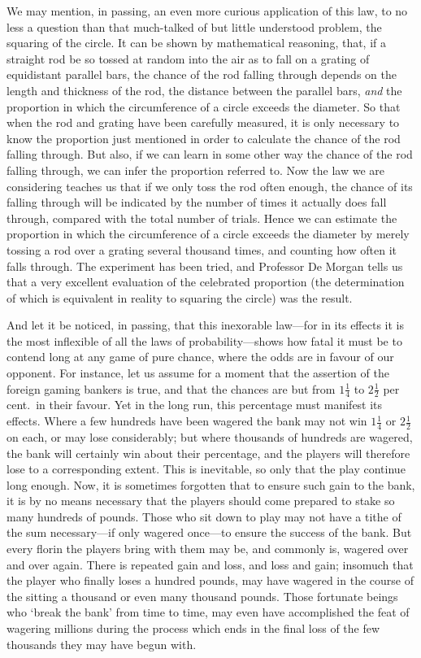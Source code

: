 \documentclass[letterpaper,12pt,oneside,openany]{memoir}
\begin{document}
We may mention, in passing, an even more curious
application of this law, to no less a question than that
much-talked of but little understood problem, the
squaring of the circle. It can be shown by mathematical
reasoning, that, if a straight rod be so tossed
at random into the air as to fall on a grating of equidistant
parallel bars, the chance of the rod falling
through depends on the length and thickness of the
rod, the distance between the parallel bars, \textit{and} the
proportion in which the circumference of a circle exceeds
the diameter. So that when the rod and grating
have been carefully measured, it is only necessary to
know the proportion just mentioned in order to calculate
the chance of the rod falling through. But also,
if we can learn in some other way the chance of the rod
falling through, we can infer the proportion referred to.
Now the law we are considering teaches us that if we
only toss the rod often enough, the chance of its falling
through will be indicated by the number of times it
actually does fall through, compared with the total
number of trials. Hence we can estimate the proportion
in which the circumference of a circle exceeds the
diameter by merely tossing a rod over a grating several
thousand times, and counting how often it falls through.
The experiment has been tried, and Professor De Morgan
tells us that a very excellent evaluation of the celebrated
proportion (the determination of which is equivalent in
reality to squaring the circle) was the result.

And let it be noticed, in passing, that this inexorable
law---for in its effects it is the most inflexible of all the
laws of probability---shows how fatal it must be to
contend long at any game of pure chance, where the
odds are in favour of our opponent. For instance, let
us assume for a moment that the assertion of the foreign
gaming bankers is true, and that the chances are but
from $1\frac{1}{4}$ to $2\frac{1}{2}$ per cent.\ in their favour. Yet in the
long run, this percentage must manifest its effects.
Where a few hundreds have been wagered the bank
may not win $1\frac{1}{4}$ or $2\frac{1}{2}$ on each, or may lose considerably;
but where thousands of hundreds are wagered, the bank
will certainly win about their percentage, and the players
will therefore lose to a corresponding extent. This is
inevitable, so only that the play continue long enough.
Now, it is sometimes forgotten that to ensure such gain
to the bank, it is by no means necessary that the players
should come prepared to stake so many hundreds of
pounds. Those who sit down to play may not have a
tithe of the sum necessary---if only wagered once---to
ensure the success of the bank. But every florin the
players bring with them may be, and commonly is,
wagered over and over again. There is repeated gain
and loss, and loss and gain; insomuch that the player
who finally loses a hundred pounds, may have wagered
in the course of the sitting a thousand or even many
thousand pounds. Those fortunate beings who `break
the bank' from time to time, may even have accomplished
the feat of wagering millions during the process
which ends in the final loss of the few thousands they
may have begun with.
\end{document}

